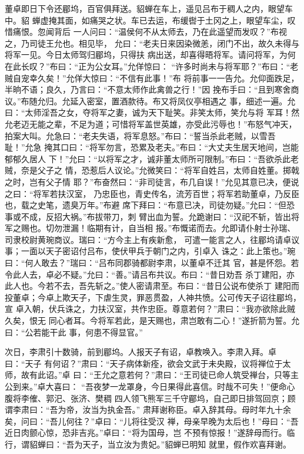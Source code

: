 董卓即日下令还郿坞，百官俱拜送。貂蝉在车上，遥见吕布于稠人之内，眼望车中。貂
蝉虚掩其面，如痛哭之状。车已去运，布缓辔于土冈之上，眼望车尘，叹惜痛恨。忽闻背后
一人问曰：“温侯何不从太师去，乃在此遥望而发叹？”布视之，乃司徒王允也。相见毕，
允曰：“老夫日来因染微恙，闭门不出，故久未得与将军一见。今日太师驾归郿坞，只得扶
病出送，却喜得晤将军。请问将军，为何在此长叹？”布曰：“正为公女耳。”允佯惊曰：
“许多时尚未与将军耶？”布曰：“老贼自宠幸久矣！”允佯大惊曰：“不信有此事！”布
将前事一一告允。允仰面跌足，半晌不语；良久，乃言曰：“不意太师作此禽兽之行！”因
挽布手曰：“且到寒舍商议。”布随允归。允延入密室，置酒款待。布又将凤仪亭相遇之
事，细述一遍。允曰：“太师淫吾之女，夺将军之妻，诚为天下耻笑。非笑太师，笑允与将
军耳！然允老迈无能之辈，不足为道；可惜将军盖世英雄，亦受此污辱也！”布怒气冲天，
拍案大叫。允急曰：“老夫失语，将军息怒。”布曰：“誓当杀此老贼，以雪吾耻！”允急
掩其口曰：“将军勿言，恐累及老夫。”布曰：“大丈夫生居天地间，岂能郁郁久居人
下！”允曰：“以将军之才，诚非董太师所可限制。”布曰：“吾欲杀此老贼，奈是父子之
情，恐惹后人议论。”允微笑曰：“将军自姓吕，太师自姓董。掷戟之时，岂有父子情
耶？”布奋然曰：“非司徒言，布几自误！”允见其意已决，便说之曰：“将军若扶汉室，
乃忠臣也，青史传名，流芳百世；将军若助董卓，乃反臣也，载之史笔，遗臭万年。”布避
席下拜曰：“布意已决，司徒勿疑。”允曰：“但恐事或不成，反招大祸。”布拔带刀，刺
臂出血为誓。允跪谢曰：“汉祀不斩，皆出将军之赐也。切勿泄漏！临期有计，自当相
报。”布慨诺而去。允即请仆射士孙瑞、司隶校尉黄琬商议。瑞曰：“方今主上有疾新愈，
可遣一能言之人，往郿坞请卓议事；一面以天子密诏付吕布，使伏甲兵于朝门之内，引卓入
诛之：此上策也。”琬曰：“何人敢去？”瑞曰：“吕布同郡骑都尉李肃，以董卓不迁其
官，甚是怀怨。若令此人去，卓必不疑。”允曰：“善。”请吕布共议。布曰：“昔日劝吾
杀丁建阳，亦此人也。今若不去，吾先斩之。”使人密请肃至。布曰：“昔日公说布使杀丁
建阳而投董卓；今卓上欺天子，下虐生灵，罪恶贯盈，人神共愤。公可传天子诏往郿坞，宣
卓入朝，伏兵诛之，力扶汉室，共作忠臣。尊意若何？”肃曰：“我亦欲除此贼久矣，恨无
同心者耳。今将军若此，是天赐也，肃岂敢有二心！”遂折箭为誓。允曰：“公若能干此
事，何患不得显官。”

次日，李肃引十数骑，前到郿坞。人报天子有诏，卓教唤入。李肃入拜。卓曰：“天子
有何诏？”肃曰：“天子病体新痊，欲会文武于未央殿，议将禅位于太师，故有此诏。”卓
曰：“王允之意若何？”肃曰：“王司徒已命人筑受禅台，只等主公到来。”卓大喜曰：
“吾夜梦一龙罩身，今日果得此喜信。时哉不可失！”便命心腹将李傕、郭汜、张济、樊稠
四人领飞熊军三千守郿坞，自己即日排驾回京；顾谓李肃曰：“吾为帝，汝当为执金吾。”
肃拜谢称臣。卓入辞其母。母时年九十余矣，问曰：“吾儿何往？”卓曰：“儿将往受汉
禅，母亲早晚为太后也！”母曰：“吾近日肉颤心惊，恐非吉兆。”卓曰：“将为国母，岂
不预有惊报！”遂辞母而行。临行，谓貂蝉曰：“吾为天子，当立汝为贵妃。”貂蝉已明知
就里，假作欢喜拜谢。

